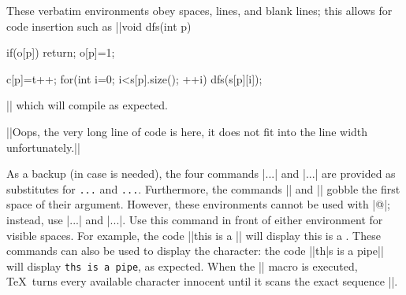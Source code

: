 These verbatim environments obey spaces, lines, and blank lines; this allows for code insertion such as
||void dfs(int p){
    if(o[p]) return;
    o[p]=1;
    
    c[p]=t++;
    for(int i=0; i<s[p].size(); ++i){
        dfs(s[p][i]);
    }
}||
which will compile as expected.

||Oops, the very long line of code is here, it does not fit into the line width unfortunately.||

As a backup (in case {\tt\pipe} is needed), the four commands |\bverb...\everb| and |\bverbatim...\everbatim| are provided as substitutes for {\tt\pipe...\pipe} and {\tt\pipe\pipe...\pipe\pipe}. Furthermore, the commands |\bverb| and |\bverbs| gobble the first space of their argument. However, these environments cannot be used with |@|; instead, use |\bverbs...\everbs| and |\bverbatims...\everbatims|. Use this command in front of either environment for visible spaces. For example, the code
||\bverbs this is a \test\everbs||
will display \bverbs this is a \test\everbs.
These commands can also be used to display the {\tt\pipe} character: the code
||\bverb th|s is a pipe\everb||
will display {\tt th\pipe s is a pipe}, as expected. When the |\bverb| macro is executed, \TeX\ turns every available character innocent until it scans the exact sequence |\everb|.

\bye